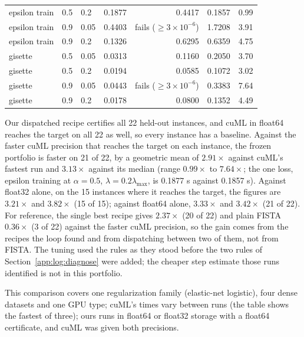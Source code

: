 \begin{center}
\begin{tabular}{lllrrrr}
epsilon train & 0.5 & 0.2 & 0.1877 & 0.4417 & 0.1857 & 0.99 \\
epsilon train & 0.9 & 0.05 & 0.4403 & fails ($\ge3\times10^{-6}$) & 1.7208 & 3.91 \\
epsilon train & 0.9 & 0.2 & 0.1326 & 0.6295 & 0.6359 & 4.75 \\
gisette & 0.5 & 0.05 & 0.0313 & 0.1160 & 0.2050 & 3.70 \\
gisette & 0.5 & 0.2 & 0.0194 & 0.0585 & 0.1072 & 3.02 \\
gisette & 0.9 & 0.05 & 0.0443 & fails ($\ge3\times10^{-6}$) & 0.3383 & 7.64 \\
gisette & 0.9 & 0.2 & 0.0178 & 0.0800 & 0.1352 & 4.49 \\
\bottomrule
\end{tabular}
\end{center}

Our dispatched recipe certifies all 22 held-out instances, and cuML in float64
reaches the target on all 22 as well, so every instance has a baseline. Against
the faster cuML precision that reaches the target on each instance, the frozen
portfolio is faster on 21 of 22, by a geometric mean of $2.91\times$ against cuML's
fastest run and $3.13\times$ against its median (range $0.99\times$ to $7.64\times$;
the one loss, epsilon training at $\alpha=0.5$, $\lambda=0.2\lambda_{\max}$, is 0.1877 s
against 0.1857 s). Against float32 alone, on the 15 instances where it reaches the
target, the figures are $3.21\times$ and $3.82\times$ (15 of 15); against float64 alone,
$3.33\times$ and $3.42\times$ (21 of 22). For reference, the single best recipe gives
$2.37\times$ (20 of 22) and plain FISTA $0.36\times$ (3 of 22) against the faster cuML
precision, so the gain comes from the recipes the loop found and from dispatching
between two of them, not from FISTA. The tuning used the rules as they stood before
the two rules of Section~\ref{app:log:diagnose} were added; the cheaper step estimate
those runs identified is not in this portfolio.

This comparison covers one regularization family (elastic-net logistic), four dense datasets and
one GPU type; cuML's times vary between runs (the table shows the fastest of three);
ours runs in float64 or float32 storage with a float64
certificate, and cuML was given both precisions.

